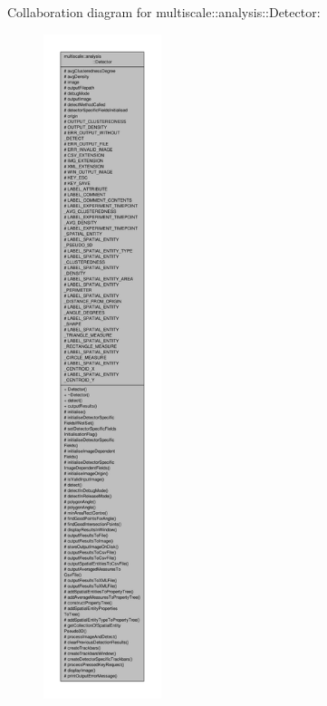 \-Collaboration diagram for multiscale\-:\-:analysis\-:\-:\-Detector\-:
\nopagebreak
\begin{figure}[H]
\begin{center}
\leavevmode
\includegraphics[height=550pt]{classmultiscale_1_1analysis_1_1Detector__coll__graph}
\end{center}
\end{figure}

